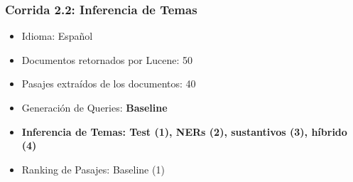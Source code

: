 \begin{frame}
\frametitle{Corrida 2.2: Inferencia de Temas}

\begin{itemize}
  \item Idioma: Español
  \item Documentos retornados por Lucene: 50
  \item Pasajes extraídos de los documentos: 40
  \item Generación de Queries: \textbf{Baseline}
  \item \textbf{{\color{blue}Inferencia de Temas: Test (1), NERs (2), sustantivos (3), híbrido (4)}}
  \item Ranking de Pasajes: Baseline (1)
\end{itemize}

\end{frame}

